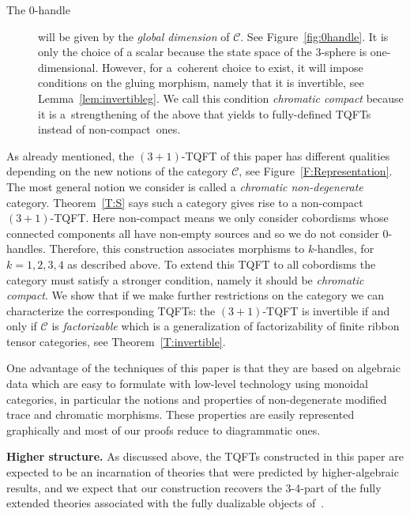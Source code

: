 \documentclass[pdftex]{sigma}
\numberwithin{equation}{section}
\numberwithin{theorem}{section}
\numberwithin{proposition}{section}
\numberwithin{definition}{section}
\numberwithin{lemma}{section}
\numberwithin{corollary}{section}
\numberwithin{remark}{section}
\numberwithin{example}{section}
\newcommand{\cat}{\mathcal{C}}
\begin{document}
\begin{description}
\item[The 0-handle] will be given by the \emph{global dimension} of $\cat$. See Figure~\ref{fig:0handle}. It is only the choice of a scalar because the state space of the 3-sphere is one-dimensional. However, for a~coherent choice to exist, it will impose conditions on the gluing morphism, namely that it is invertible, see Lemma~\ref{lem:invertibleg}. We call this condition \emph{chromatic compact} because it is a~strengthening of the above that yields to fully-defined TQFTs instead of non-compact~ones.
\end{description}

As already mentioned, the $(3+1)$-TQFT of this paper has different qualities depending on
the new notions of the category $\cat$, see Figure~\ref{F:Representation}.
The most general notion we
consider is called a \emph{chromatic non-degenerate} category.
Theorem~\ref{T:S} says such a category gives rise to a non-compact $(3+1)$-TQFT. Here non-compact means we only
consider cobordisms whose connected components all have non-empty sources and so we do not consider $0$-handles. Therefore, this construction associates morphisms to $k$-handles,
for $k=1,2,3,4$ as described above. To extend this TQFT to
all cobordisms the category must satisfy a stronger condition, namely it should be
\emph{chromatic compact}. We show that if we make further
restrictions on the category we can characterize the corresponding
TQFTs: the $(3+1)$-TQFT is invertible if and only if $\cat$ is
\emph{factorizable} which is a generalization of factorizability of
finite ribbon tensor categories, see Theorem~\ref{T:invertible}.

One advantage of the techniques of this paper is that they are based on algebraic data which are easy to formulate with low-level technology using monoidal categories, in particular the notions and properties of non-degenerate modified trace and chromatic morphisms.
These properties are easily represented graphically and most of our proofs reduce to diagrammatic ones.

\textbf{Higher structure.}
As discussed above, the TQFTs constructed in this paper are expected to be an incarnation of theories that were predicted by higher-algebraic results, and we expect that our construction recovers the 3-4-part of the fully extended theories associated with the fully dualizable objects of~\cite{BJSS}.
\end{document}
